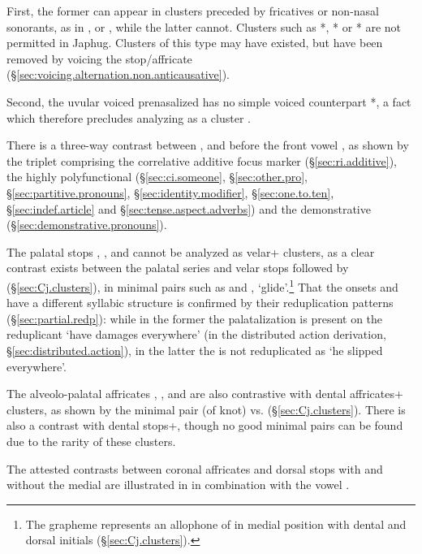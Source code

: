 First, the former can appear in clusters preceded by fricatives or non-nasal sonorants, as in ,  or , while the latter cannot. Clusters such as *, * or * are not permitted in Japhug. Clusters of this type may have existed, but have been removed by voicing the stop/affricate (§\ref{sec:voicing.alternation.non.anticausative}).

Second, the uvular voiced prenasalized  has no simple voiced counterpart *, a fact which therefore precludes analyzing  as a cluster .

There is a three-way contrast between ,  and  before the front vowel , as shown by the triplet comprising the correlative additive focus marker  (§\ref{sec:ri.additive}), the highly polyfunctional  (§\ref{sec:ci.someone}, §\ref{sec:other.pro}, §\ref{sec:partitive.pronouns}, §\ref{sec:identity.modifier}, §\ref{sec:one.to.ten}, §\ref{sec:indef.article} and §\ref{sec:tense.aspect.adverbs}) and the demonstrative  (§\ref{sec:demonstrative.pronouns}). 

The palatal stops , ,  and  cannot be analyzed as velar+ clusters, as a clear contrast exists between the palatal series and velar stops followed by  (§\ref{sec:Cj.clusters}), in minimal pairs such as  and , `glide'.\footnote{The grapheme  represents an allophone of  in medial position with dental and dorsal initials (§\ref{sec:Cj.clusters}).} That the onsets  and  have a different syllabic structure is confirmed by their reduplication patterns (§\ref{sec:partial.redp}): while in the former the palatalization is present on the reduplicant  `have damages everywhere' (in the distributed action derivation, §\ref{sec:distributed.action}), in the latter the  is not reduplicated as   `he slipped everywhere'. 

The alveolo-palatal affricates , ,  and  are also contrastive with dental affricates+ clusters, as shown by the minimal pair  (of knot) vs.  (§\ref{sec:Cj.clusters}). There is also a contrast with dental stops+, though no good minimal pairs can be found due to the rarity of these clusters.

The attested contrasts between coronal affricates and dorsal stops with and without the  medial are illustrated in  in combination with the vowel . 

